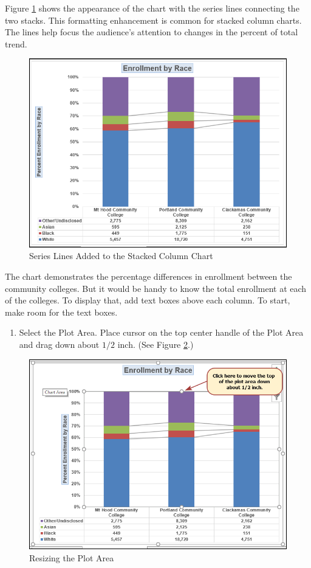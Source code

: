 Figure \ref{04:fig41} shows the appearance of the chart with the series lines connecting the two stacks. This formatting enhancement is common for stacked column charts. The lines help focus the audience's attention to changes in the percent of total trend.

\begin{figure}[H]
	\centering
	\includegraphics[width=\maxwidth{.95\linewidth}]{gfx/ch04_fig41}
	\caption{Series Lines Added to the Stacked Column Chart}
	\label{04:fig41}
\end{figure}

The chart demonstrates the percentage differences in enrollment between the community colleges. But it would be handy to know the total enrollment at each of the colleges. To display that, add text boxes above each column. To start, make room for the text boxes.

\begin{enumerate}
	\item Select the Plot Area. Place cursor on the top center handle of the Plot Area and drag down about $ 1/2 $ inch. (See Figure \ref{04:fig42}.)
\end{enumerate}

\begin{figure}[H]
	\centering
	\includegraphics[width=\maxwidth{.95\linewidth}]{gfx/ch04_fig42}
	\caption{Resizing the Plot Area}
	\label{04:fig42}
\end{figure}

